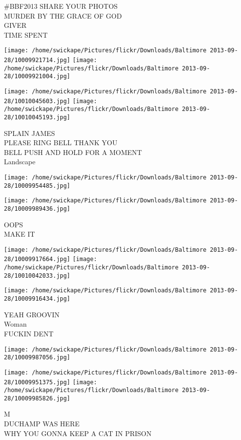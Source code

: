 \documentclass[10pt,letterpaper]{article}
\begin{document}
\#BBF2013 SHARE YOUR PHOTOS\\
MURDER BY THE GRACE OF GOD\\
GIVER\\
TIME SPENT
\pagebreak

\texttt{[image: /home/swickape/Pictures/flickr/Downloads/Baltimore 2013-09-28/10009921714.jpg]}
\texttt{[image: /home/swickape/Pictures/flickr/Downloads/Baltimore 2013-09-28/10009921004.jpg]}

\texttt{[image: /home/swickape/Pictures/flickr/Downloads/Baltimore 2013-09-28/10010045603.jpg]}
\texttt{[image: /home/swickape/Pictures/flickr/Downloads/Baltimore 2013-09-28/10010045193.jpg]}

SPLAIN JAMES\\
PLEASE RING BELL THANK YOU\\
BELL PUSH AND HOLD FOR A MOMENT\\
Landscape
\pagebreak

\texttt{[image: /home/swickape/Pictures/flickr/Downloads/Baltimore 2013-09-28/10009954485.jpg]}

\vspace{0.25in}
\texttt{[image: /home/swickape/Pictures/flickr/Downloads/Baltimore 2013-09-28/10009989436.jpg]}

OOPS\\
MAKE IT
\pagebreak

\texttt{[image: /home/swickape/Pictures/flickr/Downloads/Baltimore 2013-09-28/10009917664.jpg]}
\texttt{[image: /home/swickape/Pictures/flickr/Downloads/Baltimore 2013-09-28/10010042033.jpg]}

\texttt{[image: /home/swickape/Pictures/flickr/Downloads/Baltimore 2013-09-28/10009916434.jpg]}

YEAH GROOVIN\\
Woman\\
FUCKIN DENT
\pagebreak

\texttt{[image: /home/swickape/Pictures/flickr/Downloads/Baltimore 2013-09-28/10009987056.jpg]}

\vspace{0.25in}
\texttt{[image: /home/swickape/Pictures/flickr/Downloads/Baltimore 2013-09-28/10009951375.jpg]}
\texttt{[image: /home/swickape/Pictures/flickr/Downloads/Baltimore 2013-09-28/10009985826.jpg]}

M\\
DUCHAMP WAS HERE\\
WHY YOU GONNA KEEP A CAT IN PRISON
\pagebreak
\end{document}
